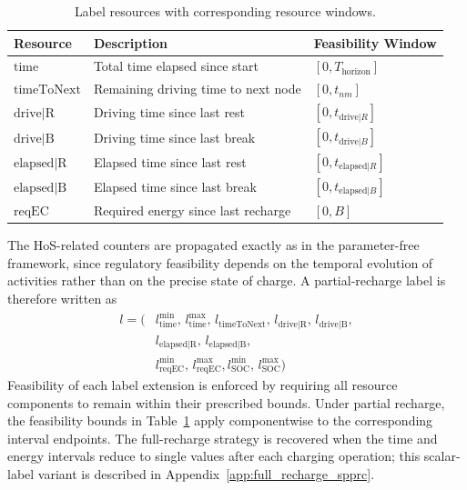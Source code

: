 \documentclass[3p,11pt,authoryear]{elsarticle}  %
\begin{document}
\begin{table}[!htbp]
\centering
\caption{Label resources with corresponding resource windows.}
\label{tab:resource_windows_partial}
\begin{tabular}{@{}lll@{}}
\toprule
\textbf{Resource} & \textbf{Description} & \textbf{Feasibility Window} \\
\midrule
$ \text{time} $ & Total time elapsed since start & $  [0, T_{\text{horizon}}] $ \\
$ \text{timeToNext} $ & Remaining driving time to next node & $ [0, t_{nm}] $ \\
$ \text{drive|R} $ & Driving time since last rest & $ [0, t_{\text{drive}|R}] $ \\
$ \text{drive|B} $ & Driving time since last break & $ [0, t_{\text{drive}|B}] $ \\
$ \text{elapsed|R} $ & Elapsed time since last rest & $ [0, t_{\text{elapsed}|R}] $ \\
$ \text{elapsed|B} $ & Elapsed time since last break & $ [0, t_{\text{elapsed}|B}] $ \\
$ \text{reqEC} $ & Required energy since last recharge & $ [0, B] $ \\
\bottomrule
\end{tabular}
\end{table}

The HoS-related counters are propagated exactly as in the parameter-free framework, since regulatory feasibility depends on the temporal evolution of activities rather than on the precise state of charge. A partial-recharge label is therefore written as
\[
\begin{aligned}
l = (&l_{\text{time}}^{\min},\, l_{\text{time}}^{\max},\, l_{\text{timeToNext}},\, 
      l_{\text{drive|R}},\, l_{\text{drive|B}},\\
     &l_{\text{elapsed|R}},\, l_{\text{elapsed|B}}, \\ 
     &l_{\text{reqEC}}^{\min},\, l_{\text{reqEC}}^{\max},
      l_{\text{SOC}}^{\min},\, l_{\text{SOC}}^{\max})
\end{aligned}
\]
Feasibility of each label extension is enforced by requiring all resource components to remain within their prescribed bounds. Under partial recharge, the feasibility bounds in Table~\ref{tab:resource_windows_partial} apply componentwise to the corresponding interval endpoints. The full-recharge strategy is recovered when the time and energy intervals reduce to single values after each charging operation; this scalar-label variant is described in Appendix~\ref{app:full_recharge_spprc}.
\end{document}
